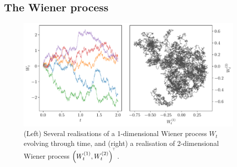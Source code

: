 \subsection{The Wiener process}

\begin{figure}
	\centering
		\includegraphics[width=\textwidth]{chp02_background/figures/wiener_realisations}
		\caption{(Left) Several realisations of a 1-dimensional Wiener process \(W_t\) evolving through time, and (right) a realisation of 2-dimensional Wiener process \(\left(W_t^{(1)}, W_t^{(2)}\right)^{^{\!\top}}\).}
		\label{fig:wiener_rels}
\end{figure}

